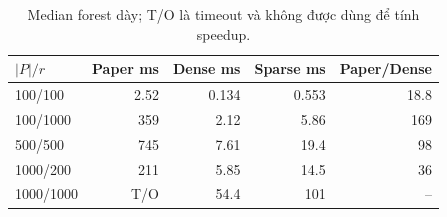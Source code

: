 \begin{table}[htbp]
\centering
\small
\setlength{\tabcolsep}{4pt}
\caption{Median forest dày; T/O là timeout và không được dùng để tính speedup.}
\label{tab:forest-repeated}
\begin{tabular}{lrrrr}
\toprule
$|P|/r$ & Paper ms & Dense ms & Sparse ms & Paper/Dense \\
\midrule
100/100 & 2.52 & 0.134 & 0.553 & 18.8 \\
100/1000 & 359 & 2.12 & 5.86 & 169 \\
500/500 & 745 & 7.61 & 19.4 & 98 \\
1000/200 & 211 & 5.85 & 14.5 & 36 \\
1000/1000 & T/O & 54.4 & 101 & -- \\
\bottomrule
\end{tabular}
\end{table}
